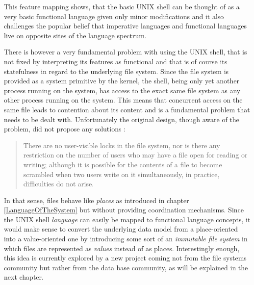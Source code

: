 This feature mapping shows, that the basic UNIX shell can be thought
of as a very basic functional language given only minor modifications
and it also challenges the popular belief that imperative languages
and functional languages live on opposite sites of the language
spectrum.

There is however a very fundamental problem with using the UNIX shell,
that is not fixed by interpreting its features as functional and
that is of course its statefulness in regard to the underlying file
system. Since the file system is provided as a system primitive by
the kernel, the shell, being only yet another process running on
the system, has access to the exact same file system as any other
process running on the system. This means that concurrent access
on the same file leads to contention about its content and
is a fundamental problem that needs to be dealt with. Unfortunately
the original design, though aware of the problem,
did not propose any solutions \cite[chapter 3.6]{unix78}:



\blockquote{There are no user-visible locks in the
file system, nor is there any restriction on the number of users
who may have a file open for reading or writing; although it is
possible for the contents of a file to become scrambled when two
users write on it simultaneously, in practice, difficulties do
not arise.}


In that sense, files behave like \textit{places} as introduced in
chapter \ref{LanguageOfTheSystem} but without providing coordination
mechanisms. Since the UNIX shell \textit{language} can easily be
mapped to functional language concepts, it would make sense to convert
the underlying data model from a place-oriented into a
value-oriented one by introducing some sort of an \textit{immutable
file system} in which files are represented as \textit{values} instead of
as places.
Interestingly enough, this idea is currently explored by a new
project coming not from the file systems community but rather
from the data base community, as will be explained in the next
chapter.



